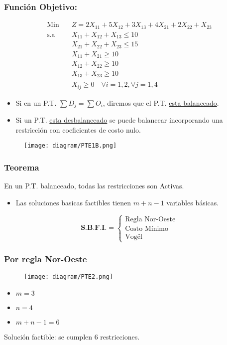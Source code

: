 \documentclass{templateNote}
\begin{document}
\subsubsection*{Función Objetivo:}
\begin{equation*}
    \begin{aligned}
        \text{Min} \quad & Z = 2X_{11} + 5X_{12} + 3X_{13} + 4X_{21} + 2X_{22} + X_{23}\\
        \text{s.a} \quad & X_{11} + X_{12} + X_{13} \leq 10 \\
        & X_{21} + X_{22} + X_{23} \leq 15 \\
        & X_{11} + X_{21} \geq 10 \\
        & X_{12} + X_{22} \geq 10 \\
        & X_{13} + X_{23} \geq 10 \\
        & X_{ij} \geq 0 \quad \forall i = \overline{1,2}, \forall j = \overline{1,4}
    \end{aligned}
\end{equation*}
\begin{itemize}
    \item Si en un P.T. $\sum{D_j} = \sum{O_i}$, diremos que el P.T. \underline{esta balanceado}.
\end{itemize}

\newpage
\begin{itemize}
    \item Si un P.T. \underline{esta desbalanceado} se puede balancear incorporando una restricción con coeficientes de costo nulo.
\end{itemize}
\begin{figure}[H]
    \centering
    \texttt{[image: diagram/PTE1B.png]}
\end{figure}

\subsubsection*{Teorema}
En un P.T. balanceado, todas las restricciones son Activas.
\begin{itemize}
    \item Las soluciones basicas factibles tienen $m+n-1$ variables básicas.
\end{itemize}

\begin{equation*}
    \textbf{S.B.F.I.} = \left\{
        \begin{array}{l} \text{Regla Nor-Oeste} \\
            \text{Costo Mínimo} \\
            \text{Vogël}
        \end{array}
    \right.
\end{equation*}

\subsubsection*{Por regla Nor-Oeste}
\begin{figure}[H]
    \centering
    \texttt{[image: diagram/PTE2.png]}
\end{figure}
\begin{itemize}
    \item $m = 3$
    \item $n = 4$
    \item $m+n-1 = 6$
\end{itemize}
Solución factible: se cumplen 6 restricciones.
\end{document}
